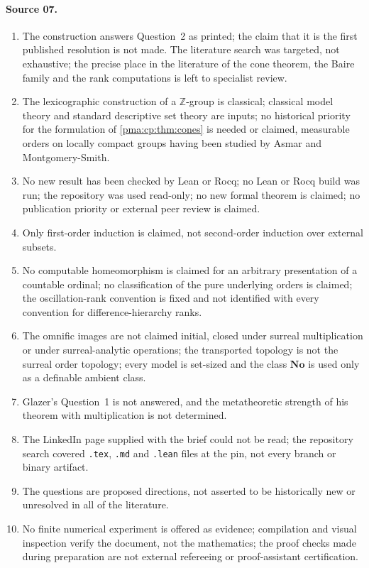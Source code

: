 \documentclass[11pt]{article}
\numberwithin{equation}{section}
\theoremstyle{definition}
\theoremstyle{remark}
\newcommand{\Z}{\mathbb Z}
\newcommand{\No}{\mathbf{No}}
\begin{document}
\paragraph{Source 07.}
\begin{enumerate}[label=07.\arabic*]
\item The construction answers Question~2 as printed; the claim that it is the
first published resolution is not made. The literature search was targeted,
not exhaustive; the precise place in the literature of the cone theorem, the
Baire family and the rank computations is left to specialist review.
\item The lexicographic construction of a $\Z$-group is classical; classical
model theory and standard descriptive set theory are inputs; no historical
priority for the formulation of \cref{pma:cp:thm:cones} is needed or claimed,
measurable orders on locally compact groups having been studied by Asmar and
Montgomery-Smith.
\item No new result has been checked by Lean or Rocq; no Lean or Rocq build was
run; the repository was used read-only; no new formal theorem is claimed; no
publication priority or external peer review is claimed.
\item Only first-order induction is claimed, not second-order induction over
external subsets.
\item No computable homeomorphism is claimed for an arbitrary presentation of
a countable ordinal; no classification of the pure underlying orders is
claimed; the oscillation-rank convention is fixed and not identified with
every convention for difference-hierarchy ranks.
\item The omnific images are not claimed initial, closed under surreal
multiplication or under surreal-analytic operations; the transported
topology is not the surreal order topology; every model is set-sized and the
class $\No$ is used only as a definable ambient class.
\item Glazer's Question~1 is not answered, and the metatheoretic strength of
his theorem with multiplication is not determined.
\item The LinkedIn page supplied with the brief could not be read; the
repository search covered \texttt{.tex}, \texttt{.md} and \texttt{.lean} files
at the pin, not every branch or binary artifact.
\item The questions are proposed directions, not asserted to be historically
new or unresolved in all of the literature.
\item No finite numerical experiment is offered as evidence; compilation and
visual inspection verify the document, not the mathematics; the proof checks
made during preparation are not external refereeing or proof-assistant
certification.
\end{enumerate}
\end{document}
